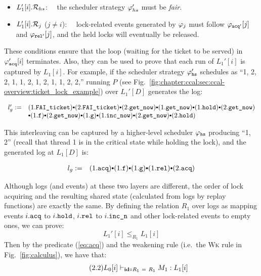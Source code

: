 \begin{itemize}\itemsep1em
\item $L_1'[i].\mathcal{R}_{hs}$:~~  the scheduler strategy $\varphi_{hs}'$ must be \emph{fair}.
\item $L_1'[i].\mathcal{R}_{j}$ ($j\neq i$):~~ lock-related events 
 generated by $\varphi_{j}$ must follow $\varphi_{{\mathrm{\texttt{acq}}}'}[j]$ and $\varphi_{{\mathrm{\texttt{rel}}}'}[j]$, and the held locks will eventually be released.
\end{itemize}

\noindent These conditions ensure that the loop (waiting for the ticket 
to be served) in $\varphi_{{\mathrm{\texttt{acq}}}}'[i]$  terminates. Also, they can be used to prove that each run of $L_1'[i]$ is captured by $L_1[i]$. For example, if the scheduler strategy  $\varphi_{{\mathrm{\texttt{hs}}}}'$ schedules as  ``1, 2, 2, 1, 1, 2, 1, 2, 1, 1, 2, 2,'' running $P$ (see Fig.~\ref{fig:chapter:ccal:sec:ccal-overview:ticket_lock_example}) over $L_1'[D]$ generates the log:%

\begin{small}
\[
\begin{array}{rl}
l'_{g} := &
 (1.\incticket) \cons
(2.\incticket) \cons
(2.\getnow) \cons
(1.\getnow)  \cons 
 (1.\holdlock) \cons 
(2.\getnow) \\
&
\cons (1.\codeinmath{f})
\cons (2.\getnow)
\cons (1.\codeinmath{g})
\cons (1.\incnow) 
\cons (2.\getnow)
\cons (2.\holdlock) 
\end{array}
\]
\end{small}

\noindent This interleaving can be captured by a higher-level scheduler $\varphi_{{\mathrm{\texttt{hs}}}}$ producing ``1, 2'' (recall that thread 1 is in the critical state while holding the lock),
and the generated log at $L_1[D]$ is:%
\begin{small}
\[
\begin{array}{rl}
l_{g} := &
 (1.\codeinmath{acq})
\cons (1.\codeinmath{f})
\cons (1.\codeinmath{g})
\cons (1.\codeinmath{rel})
\cons 
 (2.\codeinmath{acq}) 
\end{array}
\]
\end{small}%
Although logs (and events) at these two layers are different, the order of lock acquiring and 
the resulting shared state (calculated from logs by replay functions) are exactly the same. By defining the relation $R_1$ over logs as mapping events $i.{\mathrm{\texttt{acq}}}$ to $i.{\mathrm{\texttt{hold}}}$, $i.{\mathrm{\texttt{rel}}}$  to $i.{\mathrm{\texttt{inc\_n}}}$ and other lock-related events to empty ones, we can prove:%
$$L_1'[i] \le_{R_1} L_1[i]$$
Then by the predicate (\ref{eq:acq}) and the weakening rule (i.e.\, the \textsc{Wk} rule in Fig.~\ref{fig:calculus}), we have that:%
\begin{equation}\label{eq:acq:h} \tag{2.2}
L_0[i] \vdash_{\textbf{id} \circ R_1\ =\ R_1} M_1 : L_1[i]
\end{equation}

